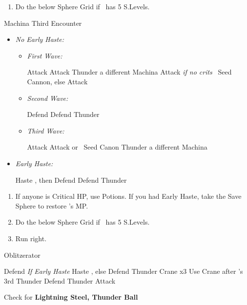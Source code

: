 \begin{enumerate}[resume]
    \item Do the below Sphere Grid if \tidus\ has 5 S.Levels.
\end{enumerate}
\begin{battle}{Machina Third Encounter}
    \begin{itemize}
        \item \textit{No Early Haste:}
        \begin{itemize}
            \item \textit{First Wave:}
            \begin{itemize}
                \tidusf Attack
                \kimahrif Attack
                \luluf Thunder a different Machina
                \tidusf Attack
                \kimahrif \textit{if no crits} \od\ Seed Cannon, else Attack
            \end{itemize}
            \item \textit{Second Wave:}
            \begin{itemize}
                \tidusf Defend
                \kimahrif Defend
                \luluf Thunder
            \end{itemize}
            \item \textit{Third Wave:}
            \begin{itemize}
                \tidusf Attack
                \kimahrif Attack or \od\ Seed Canon
                \luluf Thunder a different Machina
            \end{itemize}
        \end{itemize}
        \item \textit{Early Haste:}
        \begin{itemize}
            \tidusf Haste \lulu, then Defend
            \kimahrif Defend
            \luluf Thunder
        \end{itemize}
    \end{itemize}
\end{battle}
\begin{enumerate}[resume]
    \item If anyone is Critical HP, use Potions. If you had Early Haste, take the Save Sphere to restore \tidus's MP.
    \item Do the below Sphere Grid if \tidus\ has 5 S.Levels.
    \item Run right.
\end{enumerate}
\begin{battle}[3000]{Oblitzerator}
    \begin{itemize}
        \kimahrif Defend
        \tidusf \textit{If Early Haste} Haste \lulu, else Defend
        \luluf Thunder Crane x3
        \tidusf Use Crane after \lulu's 3rd Thunder
        \kimahrif Defend
        \luluf Thunder
        \tidusf Attack
    \end{itemize}
    Check for \textbf{Lightning Steel, Thunder Ball}
\end{battle}
